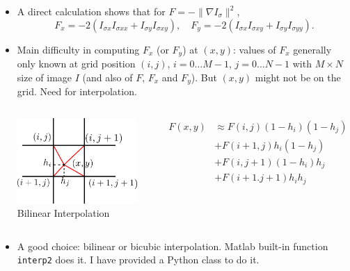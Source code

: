 \documentclass[10pt]{beamer}
\begin{document}
 \begin{frame}
   {\small
   \begin{itemize}
   \item A direct calculation shows that for $F = -\|\nabla I_\sigma\|^2$, 
     $$
     F_x = -2\left(I_{\sigma x}I_{\sigma xx} + I_{\sigma y}I_{\sigma xy}\right),\quad 
     F_y = -2\left(I_{\sigma x}I_{\sigma xy} + I_{\sigma y}I_{\sigma yy}\right).
     $$
   \item Main difficulty in computing $F_x$ (or $F_y$) at $(x,y)$: values
     of $F_x$  generally only known at grid position $(i,j)$, $i=0\dots M-1$, $j=0\dots
     N-1$ with $M\times N$ size of image $I$ (and also of $F$, $F_x$ and $F_y$). But
     $(x,y)$ might not be on the grid. Need for interpolation.
   \begin{columns}
     \begin{center}
       \includegraphics[width=0.9\textwidth]{FIGURES/bilininterp}\\
       Bilinear Interpolation
     \end{center}
     \begin{align*}
       F(x,y)&\approx F(i,j)(1-h_i)(1-h_j)\\ 
       &+ F(i+1,j)h_i(1-h_j)\\
       &+ F(i,j+1)(1-h_i)h_j\\
       &+ F(i+1.j+1)h_i h_j
     \end{align*}
   \end{columns}
   \item A good choice: bilinear or bicubic interpolation. Matlab built-in function
     \texttt{interp2} does it.  I have provided a Python class to do it.
 \end{itemize}
 }
\end{frame}
\end{document}
